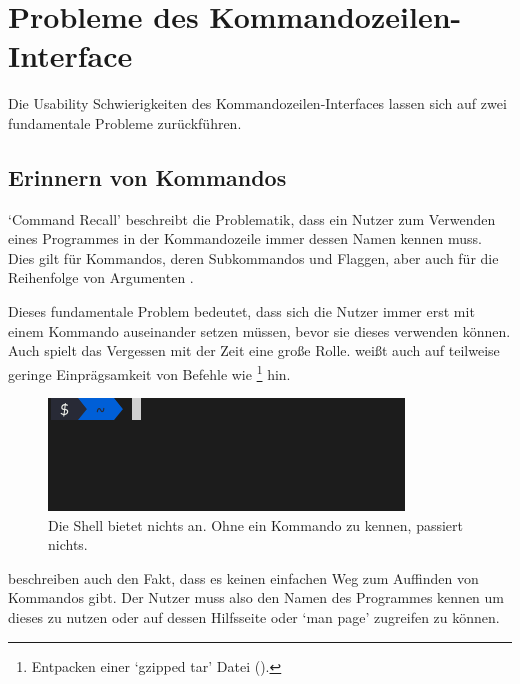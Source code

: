 \documentclass[oneside,bibliography=totocnumbered,BCOR=5mm]{scrbook}
\begin{document}
\chapter{Probleme des Kommandozeilen-Interface}
\label{sec:cli-problems}

Die Usability Schwierigkeiten des Kommandozeilen-Interfaces lassen sich auf zwei
fundamentale Probleme zurückführen.

\section{Erinnern von Kommandos}

`Command Recall' beschreibt die Problematik, dass ein Nutzer zum Verwenden eines
Programmes in der Kommandozeile immer dessen Namen kennen muss. Dies gilt für
Kommandos, deren Subkommandos und Flaggen, aber auch für die Reihenfolge von
Argumenten \parencite{Raskin_2008}.

\bigskip

\newcommand{\refcr}[1]{\hyperref[prob:cr]{#1}}
\newcommand{\refcrr}{\hyperref[prob:cr]{`Command Recall'}}

\bigskip

Dieses fundamentale Problem bedeutet, dass sich die Nutzer immer erst mit einem
Kommando auseinander setzen müssen, bevor sie dieses verwenden können. Auch
spielt das Vergessen mit der Zeit eine große Rolle. \textcite{Raskin_2008} weißt
auch auf teilweise geringe Einprägsamkeit von Befehle wie \footnote{Entpacken einer `gzipped tar' Datei ().}
hin.

\begin{figure}[H]
  \centering
  \includegraphics[scale=0.5]{empty-prompt.png}
  \caption{Die Shell bietet nichts an. Ohne ein Kommando zu kennen, passiert nichts.}
\end{figure}

\textcite{Gentner_1996} beschreiben auch den Fakt, dass es keinen einfachen Weg
zum Auffinden von Kommandos gibt. Der Nutzer muss also den Namen des Programmes
kennen um dieses zu nutzen oder auf dessen Hilfsseite oder `man page' zugreifen
zu können.
\end{document}
